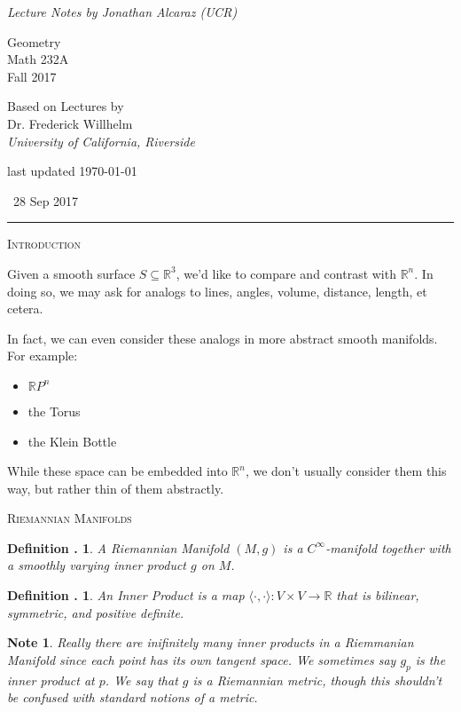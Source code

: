 \documentclass[twoside]{report}
\newcommand{\R}{\mathbb{R}}
\newcommand{\cleanbr}{\vspace{1ex}\noindent}
\newcounter{Lecture}
\newcommand{\newLec}[1]{
  \stepcounter{Lecture}
  \noindent{\Large\bf Lecture \arabic{Lecture}} \, #1 \hfill  \rule[1ex]{2.5in}{.1pt} \vspace{1em}
}
\theoremstyle{myts}
\newcounter{c}[Lecture]
\newtheorem{dfn}[c]{Definition \arabic{Lecture}.}
\newtheorem*{nte}{Note}
\newcounter{ex}[Lecture]
\begin{document}
\begin{titlepage}
  \centering
  {\it Lecture Notes by Jonathan Alcaraz (UCR)} \\
  
  \vfill
  
  {\Huge Geometry} \\
  \vspace{1em}
  {Math 232A} \\
  {Fall 2017} \\

  \vfill
  
  {Based on Lectures by} \\
  \vspace{1em}
  {\Large Dr. Frederick Willhelm} \\
  {\it University of California, Riverside}
  
  \vfill

  {\tiny last updated \today}
\end{titlepage}
\setcounter{page}{1}


\newLec{28 Sep 2017}

\noindent
{\large\scshape Introduction}

\cleanbr
  Given a smooth surface \( S \subseteq \R^3 \), we'd like to compare and contrast with \( \R^n\). In doing so, we may ask for analogs to lines, angles, volume, distance, length, et cetera.

\cleanbr
In fact, we can even consider these analogs in more abstract smooth manifolds. For example:
\begin{itemize}
  \item \(\R P^n\)
  \item the Torus
  \item the Klein Bottle
\end{itemize}

\cleanbr
While these space can be embedded into $\R^n$, we don't usually consider them this way, but rather thin of them abstractly.

\cleanbr
{\large\scshape Riemannian Manifolds}

\begin{dfn}
  A \emph{Riemannian Manifold} \( (M, g)\) is a \(C^\infty\)-manifold together with a smoothly varying inner product $g$ on $M$.
\end{dfn}

\begin{dfn}
  An \emph{Inner Product} is a map \( \langle \cdot , \cdot \rangle : V \times V \to \R \) that is bilinear, symmetric, and positive definite.
\end{dfn}

\begin{nte}
  Really there are inifinitely many inner products in a Riemmanian Manifold since each point has its own tangent space. We sometimes say $g_p$ is the inner product at $p$. We say that $g$ is a \emph{Riemannian metric}, though this shouldn't be confused with standard notions of a metric.
\end{nte}
\end{document}
